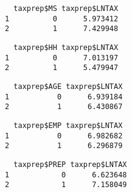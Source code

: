 \documentclass[]{book}
\newenvironment{Shaded}{\begin{snugshade}}{\end{snugshade}}
\newcommand{\KeywordTok}[1]{\textcolor[rgb]{0.13,0.29,0.53}{\textbf{#1}}}
\newcommand{\NormalTok}[1]{#1}
\newcommand{\OperatorTok}[1]{\textcolor[rgb]{0.81,0.36,0.00}{\textbf{#1}}}
\begin{document}
\begin{verbatim}
  taxprep$MS taxprep$LNTAX
1          0      5.973412
2          1      7.429948
\end{verbatim}

\begin{Shaded}
\end{Shaded}

\begin{verbatim}
  taxprep$HH taxprep$LNTAX
1          0      7.013197
2          1      5.479947
\end{verbatim}

\begin{Shaded}
\end{Shaded}

\begin{verbatim}
  taxprep$AGE taxprep$LNTAX
1           0      6.939184
2           1      6.430867
\end{verbatim}

\begin{Shaded}
\end{Shaded}

\begin{verbatim}
  taxprep$EMP taxprep$LNTAX
1           0      6.982682
2           1      6.296879
\end{verbatim}

\begin{Shaded}
\end{Shaded}

\begin{verbatim}
  taxprep$PREP taxprep$LNTAX
1            0      6.623648
2            1      7.158049
\end{verbatim}
\end{document}

